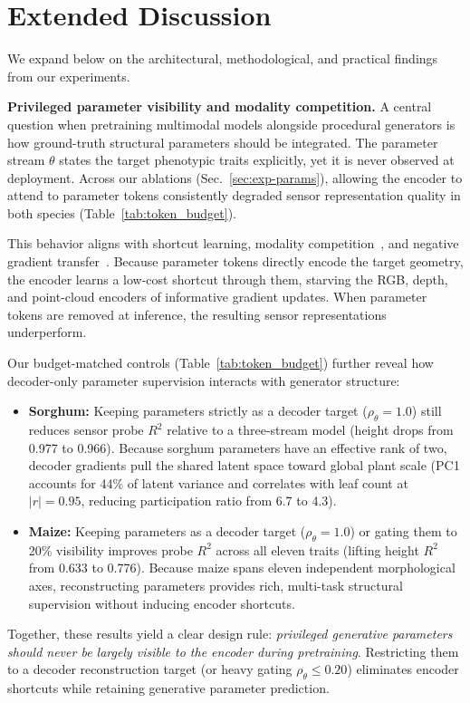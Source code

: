 \documentclass[10pt,twocolumn,letterpaper]{article}
\begin{document}
\section{Extended Discussion}
\label{app:discussion}

We expand below on the architectural, methodological, and practical findings from our experiments.

\noindent\textbf{Privileged parameter visibility and modality competition.}
A central question when pretraining multimodal models alongside procedural generators is how ground-truth structural parameters should be integrated. The parameter stream $\theta$ states the target phenotypic traits explicitly, yet it is never observed at deployment. Across our ablations (Sec.~\ref{sec:exp-params}), allowing the encoder to attend to parameter tokens consistently degraded sensor representation quality in both species (Table~\ref{tab:token_budget}).

This behavior aligns with shortcut learning, modality competition~\citep{peng2022ogm}, and negative gradient transfer~\citep{yu2020pcgrad}. Because parameter tokens directly encode the target geometry, the encoder learns a low-cost shortcut through them, starving the RGB, depth, and point-cloud encoders of informative gradient updates. When parameter tokens are removed at inference, the resulting sensor representations underperform.

Our budget-matched controls (Table~\ref{tab:token_budget}) further reveal how decoder-only parameter supervision interacts with generator structure:
\begin{itemize}
  \item \textbf{Sorghum:} Keeping parameters strictly as a decoder target ($\rho_\theta = 1.0$) still reduces sensor probe $R^2$ relative to a three-stream model (height drops from 0.977 to 0.966). Because sorghum parameters have an effective rank of two, decoder gradients pull the shared latent space toward global plant scale (PC1 accounts for 44\% of latent variance and correlates with leaf count at $|r| = 0.95$, reducing participation ratio from 6.7 to 4.3).
  \item \textbf{Maize:} Keeping parameters as a decoder target ($\rho_\theta = 1.0$) or gating them to 20\% visibility improves probe $R^2$ across all eleven traits (lifting height $R^2$ from 0.633 to 0.776). Because maize spans eleven independent morphological axes, reconstructing parameters provides rich, multi-task structural supervision without inducing encoder shortcuts.
\end{itemize}
Together, these results yield a clear design rule: \emph{privileged generative parameters should never be largely visible to the encoder during pretraining}. Restricting them to a decoder reconstruction target (or heavy gating $\rho_\theta \le 0.20$) eliminates encoder shortcuts while retaining generative parameter prediction.
\end{document}
